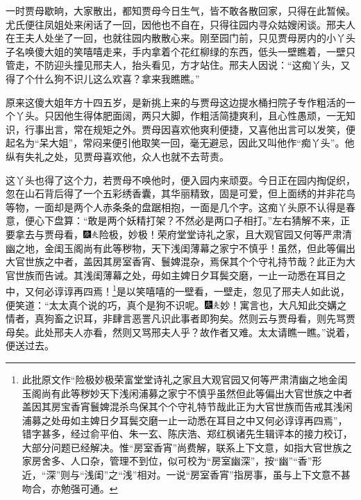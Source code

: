 一时贾母歇晌，大家散出，都知贾母今日生气，皆不敢各散回家，只得在此暂候。尤氏便往凤姐处来闲话了一回，因他也不自在，只得往园内寻众姑嫂闲谈。邢夫人在王夫人处坐了一回，也就往园内散散心来。刚至园门前，只见贾母房内的小丫头子名唤傻大姐的笑嘻嘻走来，手内拿着个花红柳绿的东西，低头一壁瞧着，一壁只管走，不防迎头撞见邢夫人，抬头看见，方才站住。邢夫人因说：“这痴丫头，又得了个什么狗不识儿这么欢喜？拿来我瞧瞧。”

原来这傻大姐年方十四五岁，是新挑上来的与贾母这边提水桶扫院子专作粗活的一个丫头。只因他生得体肥面阔，两只大脚，作粗活简捷爽利，且心性愚顽，一无知识，行事出言，常在规矩之外。贾母因喜欢他爽利便捷，又喜他出言可以发笑，便起名为“呆大姐”，常闷来便引他取笑一回，毫无避忌，因此又叫他作“痴丫头”。他纵有失礼之处，见贾母喜欢他，众人也就不去苛责。

这丫头也得了这个力，若贾母不唤他时，便入园内来顽耍。今日正在园内掏促织，忽在山石背后得了一个五彩绣香囊，其华丽精致，固是可爱，但上面绣的并非花鸟等物，一面却是两个人赤条条的盘踞相抱，一面是几个字。这痴丫头原不认得是春意，便心下盘算：“敢是两个妖精打架？不然必是两口子相打。”左右猜解不来，正要拿去与贾母看，{\includegraphics[width=3mm]{../Images/00004}\includegraphics[width=3mm]{../Images/00012}\footnotesize \kaishu 险极，妙极！荣府堂堂诗礼之家，且大观官园又何等严肃清幽之地，金闺玉阁尚有此等秽物，天下浅闺薄幕之家宁不慎乎！虽然，但此等偏出大官世族之中者，盖因其房室香宵、鬟婢混杂，焉保其个个守礼持节哉？此正为大官世族而告诫。其浅闺薄幕之处，毋如主婢日夕耳鬓交磨，一止一动悉在耳目之中，又何必谆谆再四焉！}\footnote{此批原文作“险极妙极荣富堂堂诗礼之家且大观官园又何等严肃清幽之地金闺玉阁尚有此等秽妙天下浅闲浦募之家宁不慎乎虽然但此等偏出大官世族之中者盖因其房宝香宵鬟婢混杀鸟保其个个守礼特节哉此正为大官世族而告戒其浅闲浦募之处毋如主婢日夕耳鬓交磨一止一动悉在耳目之中又何必谆谆再四焉”，错字甚多，经过俞平伯、朱一玄、陈庆浩、郑红枫诸先生辑评本的接力校订，大部分问题已经解决。惟“房室香宵”尚费解，联系上下文意，如指大官世族之家房舍多、人口杂，管理不到位，似可校为“房室幽深”，按“幽”“香”形近，“深”则与“浅闺”之“浅”相对。一说“房室香宵”指房事，虽与上下文意不甚吻合，亦勉强可通。}是以笑嘻嘻的一壁看，一壁走，忽见了邢夫人如此说，便笑道：“太太真个说的巧，真个是狗不识呢。{\includegraphics[width=3mm]{../Images/00004}\includegraphics[width=3mm]{../Images/00012}\footnotesize \kaishu 妙！寓言也，大凡知此交媾之情者，真狗畜之识耳，非肆言恶詈凡识此事者即狗矣。然则云与贾母看，则先骂贾母矣。此处邢夫人亦看，然则又骂邢夫人乎？故作者又难。}太太请瞧一瞧。”说着，便送过去。

